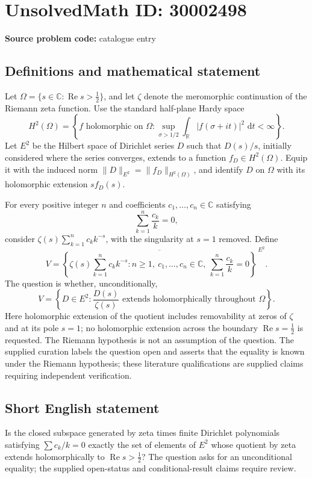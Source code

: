 \documentclass[11pt]{article}
\newcommand{\R}{\mathbb{R}}
\newcommand{\C}{\mathbb{C}}
\newcommand{\dd}{\,\mathrm{d}}
\begin{document}
\section*{UnsolvedMath ID: 30002498}
\textbf{Source problem code:} catalogue entry
\subsection{Definitions and mathematical statement}
Let \(\Omega=\{s\in\C:\operatorname{Re}s>\tfrac12\}\), and let \(\zeta\) denote the meromorphic continuation of the Riemann zeta function. Use the standard half-plane Hardy space
\[
H^2(\Omega)=\left\{f\text{ holomorphic on }\Omega:\sup_{\sigma>1/2}\int_{\R}|f(\sigma+it)|^2\,\dd t<\infty\right\}.
\]
Let \(E^2\) be the Hilbert space of Dirichlet series \(D\) such that \(D(s)/s\), initially considered where the series converges, extends to a function \(f_D\in H^2(\Omega)\). Equip it with the induced norm \(\|D\|_{E^2}=\|f_D\|_{H^2(\Omega)}\), and identify \(D\) on \(\Omega\) with its holomorphic extension \(s f_D(s)\).

For every positive integer \(n\) and coefficients \(c_1,\ldots,c_n\in\C\) satisfying
\[
\sum_{k=1}^{n}\frac{c_k}{k}=0,
\]
consider \(\zeta(s)\sum_{k=1}^{n}c_k k^{-s}\), with the singularity at \(s=1\) removed. Define
\[
V=\overline{\left\{\zeta(s)\sum_{k=1}^{n}c_k k^{-s}:n\geq1,\ c_1,\ldots,c_n\in\C,\ \sum_{k=1}^{n}\frac{c_k}{k}=0\right\}}^{\,E^2}.
\]
The question is whether, unconditionally,
\[
V=\left\{D\in E^2:\frac{D(s)}{\zeta(s)}\text{ extends holomorphically throughout }\Omega\right\}.
\]
Here holomorphic extension of the quotient includes removability at zeros of \(\zeta\) and at its pole \(s=1\); no holomorphic extension across the boundary \(\operatorname{Re}s=\tfrac12\) is requested. The Riemann hypothesis is not an assumption of the question. The supplied curation labels the question open and asserts that the equality is known under the Riemann hypothesis; these literature qualifications are supplied claims requiring independent verification.
\subsection{Short English statement}
Is the closed subspace generated by zeta times finite Dirichlet polynomials satisfying \(\sum c_k/k=0\) exactly the set of elements of \(E^2\) whose quotient by zeta extends holomorphically to \(\operatorname{Re}s>\tfrac12\)? The question asks for an unconditional equality; the supplied open-status and conditional-result claims require review.
\end{document}
